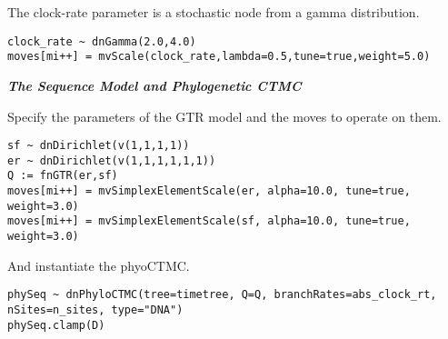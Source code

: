 
The clock-rate parameter is a stochastic node from a gamma distribution.
{\tt \begin{snugshade*}
\begin{lstlisting}
clock_rate ~ dnGamma(2.0,4.0)
moves[mi++] = mvScale(clock_rate,lambda=0.5,tune=true,weight=5.0)
\end{lstlisting}
\end{snugshade*}}


\textbf{\textit{The Sequence Model and Phylogenetic CTMC}}

Specify the parameters of the GTR model and the moves to operate on them.
{\tt \begin{snugshade*}
\begin{lstlisting}
sf ~ dnDirichlet(v(1,1,1,1))
er ~ dnDirichlet(v(1,1,1,1,1,1))
Q := fnGTR(er,sf)
moves[mi++] = mvSimplexElementScale(er, alpha=10.0, tune=true, weight=3.0)
moves[mi++] = mvSimplexElementScale(sf, alpha=10.0, tune=true, weight=3.0)
\end{lstlisting}
\end{snugshade*}}

And instantiate the phyoCTMC.
{\tt \begin{snugshade*}
\begin{lstlisting}
phySeq ~ dnPhyloCTMC(tree=timetree, Q=Q, branchRates=abs_clock_rt, nSites=n_sites, type="DNA")
phySeq.clamp(D)
\end{lstlisting}
\end{snugshade*}}

